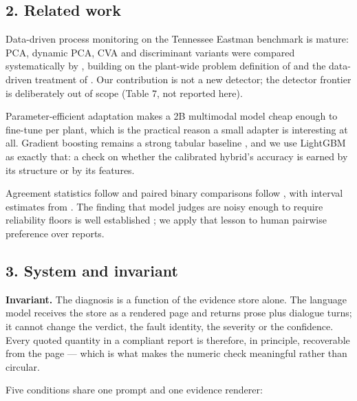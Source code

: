 \documentclass[
  10pt,
]{article}
\begin{document}
\subsection{2. Related work}\label{related-work}

Data-driven process monitoring on the Tennessee Eastman benchmark is
mature: PCA, dynamic PCA, CVA and discriminant variants were compared
systematically by \citep{yin2012comparison}, building on the plant-wide
problem definition of \citep{downs1993plant} and the data-driven
treatment of \citep{russell2000data}. Our contribution is not a new
detector; the detector frontier is deliberately out of scope (Table 7,
not reported here).

Parameter-efficient adaptation \citep{hu2021lora} makes a 2B multimodal
model \citep{zhu2025internvl3} cheap enough to fine-tune per plant,
which is the practical reason a small adapter is interesting at all.
Gradient boosting remains a strong tabular baseline
\citep{ke2017lightgbm}, and we use LightGBM as exactly that: a check on
whether the calibrated hybrid's accuracy is earned by its structure or
by its features.

Agreement statistics follow \citep{cohen1960coefficient} and paired
binary comparisons follow \citep{mcnemar1947note}, with interval
estimates from \citep{clopper1934use}. The finding that model judges are
noisy enough to require reliability floors is well established
\citep{zheng2023judging}; we apply that lesson to human pairwise
preference over reports.

\subsection{3. System and invariant}\label{system-and-invariant}

\textbf{Invariant.} The diagnosis is a function of the evidence store
alone. The language model receives the store as a rendered page and
returns prose plus dialogue turns; it cannot change the verdict, the
fault identity, the severity or the confidence. Every quoted quantity in
a compliant report is therefore, in principle, recoverable from the page
--- which is what makes the numeric check meaningful rather than
circular.

Five conditions share one prompt and one evidence renderer:
\end{document}
